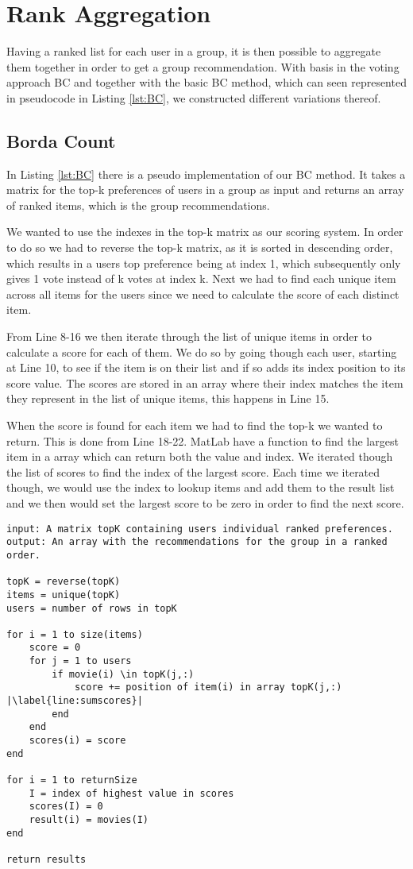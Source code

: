 \section{Rank Aggregation}\label{sec:rank_aggregation}
Having a ranked list for each user in a group, it is then possible to aggregate them together in order to get a group recommendation. With basis in the voting approach BC and together with the basic BC method, which can seen represented in pseudocode in Listing \ref{lst:BC}, we constructed different variations thereof. 
\subsection{Borda Count}
In Listing \ref{lst:BC} there is a pseudo implementation of our BC method. It takes a matrix for the top-k preferences of users in a group as input and returns an array of ranked items, which is the group recommendations. 

We wanted to use the indexes in the top-k matrix as our scoring system. In order to do so we had to reverse the top-k matrix, as it is sorted in descending order, which results in a users top preference being at index 1, which subsequently only gives 1 vote instead of k votes at index k. Next we had to find each unique item across all items for the users since we need to calculate the score of each distinct item.

From Line 8-16 we then iterate through the list of unique items in order to calculate a score for each of them. We do so by going though each user, starting at Line 10, to see if the item is on their list and if so adds its index position to its score value. The scores are stored in an array where their index matches the item they represent in the list of unique items, this happens in Line 15.

When the score is found for each item we had to find the top-k we wanted to return. This is done from Line 18-22. MatLab have a function to find the largest item in a array which can return both the value and index. We iterated though the list of scores to find the index of the largest score. Each time we iterated though, we would use the index to lookup items and add them to the result list and we then would set the largest score to be zero in order to find the next score. 
\begin{lstlisting}[caption={BC implementation},label=lst:BC,escapechar=|]
input: A matrix topK containing users individual ranked preferences.
output: An array with the recommendations for the group in a ranked order.

topK = reverse(topK)
items = unique(topK)
users = number of rows in topK

for i = 1 to size(items)
	score = 0
	for j = 1 to users
		if movie(i) \in topK(j,:)
			score += position of item(i) in array topK(j,:) |\label{line:sumscores}|
		end
	end
	scores(i) = score
end

for i = 1 to returnSize
	I = index of highest value in scores
	scores(I) = 0
	result(i) = movies(I)
end

return results

\end{lstlisting}

